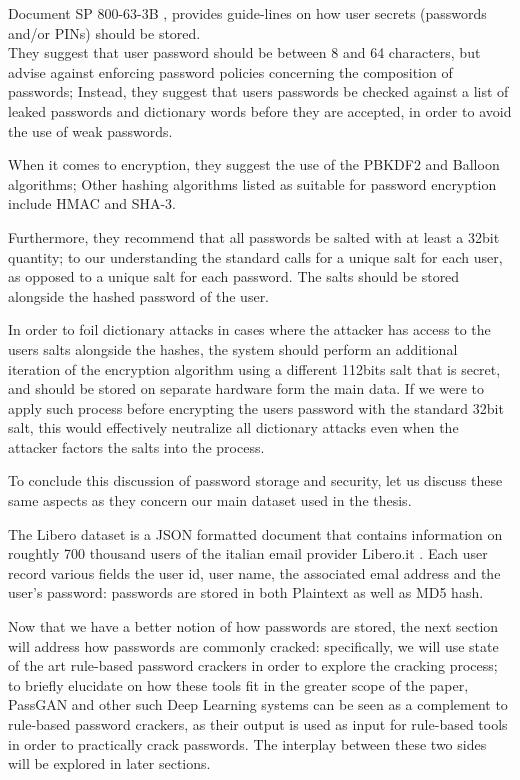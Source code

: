 Document SP 800-63-3B \cite{NIST_2017}, provides guide-lines on how user secrets (passwords and/or PINs) should be stored.\\
They suggest that user password should be between 8 and 64 characters, but advise against enforcing password policies concerning the composition of passwords; Instead, they suggest that users passwords be checked against a list of leaked passwords and dictionary words before they are accepted, in order to avoid the use of weak passwords.

When it comes to encryption, they suggest the use of the PBKDF2 and Balloon algorithms; Other hashing algorithms listed as suitable for password encryption include HMAC and SHA-3.

Furthermore, they recommend that all passwords be salted with at least a 32bit quantity; to our understanding the standard calls for a unique salt for each user, as opposed to a unique salt for each password. The salts should be stored alongside the hashed password of the user.

In order to foil dictionary attacks in cases where the attacker has access to the users salts alongside the hashes, the system should perform an additional iteration of the encryption algorithm using a different 112bits salt that is secret, and should be stored on separate hardware form the main data.\newline 
If we were to apply such process before encrypting the users password with the standard 32bit salt, this would effectively neutralize all dictionary attacks even when the attacker factors the salts into the process.

To conclude this discussion of password storage and security, let us discuss these same aspects as they concern our main dataset used in the thesis.

The Libero dataset is a JSON formatted document that contains information on roughtly 700 thousand users of the italian email provider Libero.it \cite{libero_leak}.\newline
Each user record various fields the user id, user name, the associated emal address and the user's password: passwords are stored in both Plaintext as well as MD5 hash.

Now that we have a better notion of how passwords are stored, the next section will address how passwords are commonly cracked: specifically, we will use state of the art rule-based password crackers in order to explore the cracking process; to briefly elucidate on how these tools fit in the greater scope of the paper, PassGAN and other such Deep Learning systems can be seen as a complement to rule-based password crackers, as their output is used as input for rule-based tools in order to practically crack passwords. The interplay between these two sides will be explored in later sections.

